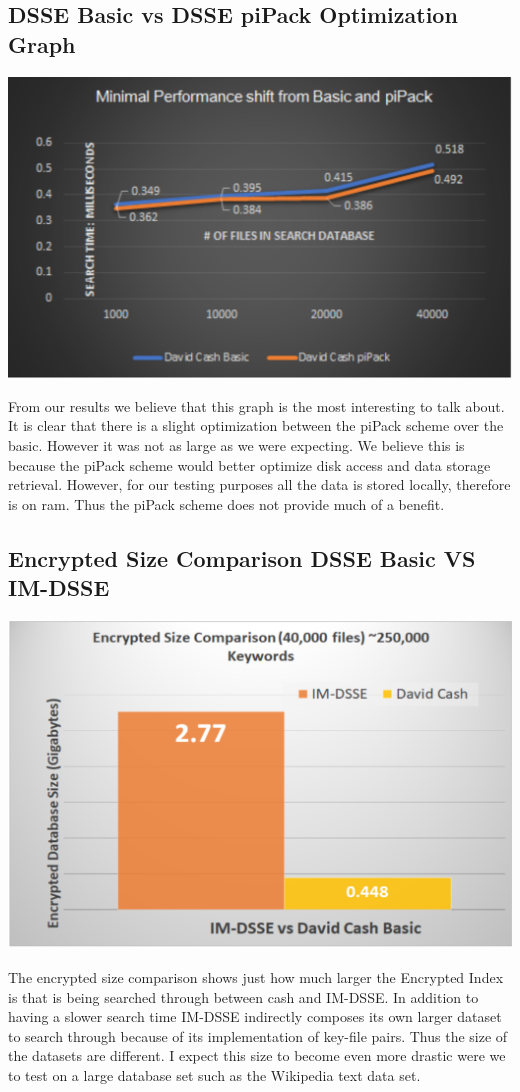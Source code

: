\subsection{DSSE Basic vs DSSE piPack Optimization Graph}

\includegraphics[width=1\textwidth]{Charts/Basic_Vs_piPack.eps}

From our results we believe that this graph is the most interesting to talk about. It is clear that there is a slight optimization between the piPack scheme over the basic. However it was not as large as we were expecting. We believe this is because the piPack scheme would better optimize disk access and data storage retrieval. However, for our testing purposes all the data is stored locally, therefore is on ram. Thus the piPack scheme does not provide much of a benefit.

\subsection{Encrypted Size Comparison DSSE Basic VS IM-DSSE}
\includegraphics[width=.8\textwidth]{Charts/encrypt.eps}

The encrypted size comparison shows just how much larger the Encrypted Index is that is being searched through between cash and IM-DSSE. In addition to having a slower search time IM-DSSE indirectly composes its own larger dataset to search through because of its implementation of key-file pairs. Thus the size of the datasets are different. I expect this size to become even more drastic were we to test on a large database set such as the Wikipedia text data set.

